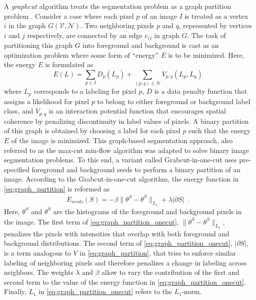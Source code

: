 A \textit{graphcut} algorithm treats the segmentation problem as a graph partition problem \cite{mincut_maxflow}. Consider a case where each pixel $p$ of an image $I$ is treated as a vertex $i$ in the graph $G(\mathcal{V},\mathcal{N})$. Two neighboring pixels $p$ and $q$, represented by vertices $i$ and $j$ respectively, are connected by an edge $e_{ij}$ in graph $G$. The task of partitioning this graph $G$ into foreground and background is cast as an optimization problem where some form of ``energy'' $E$ is to be minimized. Here, the energy $E$ is formulated as 
%
\begin{equation}	\label{eq:graph_partition}
  E(L)=\sum\limits_{p\in I} D_p(L_p)+\sum\limits_{(p,q)\in \mathcal{N}} V_{p,q} (L_p,L_q)
\end{equation}
%
where $L_p$ corresponds to a labeling for pixel $p$, $D$ is a data penalty function that assigns a likelihood for pixel $p$ to belong to either foreground or background label class, and $V_{p,q}$ is an interaction potential function that encourages spatial coherence by penalizing discontinuity in label values of pixels. A binary partition of this graph is obtained by choosing a label for each pixel $p$ such that the energy $E$ of the image is minimized. This graph-based segmentation approach, also referred to as the max-cut min-flow algorithm was adapted to solve binary image segmentation problems. To this end, a variant called Grabcut-in-one-cut \cite{onecut} uses pre-specified foreground and background seeds to perform a binary partition of an image. According to the Grabcut-in-one-cut algorithm, the energy function in \eqref{eq:graph_partition} is reformed as
%
\begin{equation} \label{eq:graph_partition_onecut}
  E_{seeds}(S)=-\beta \| \theta^S-\theta^{\bar{S}} \|_{L_1}+\lambda|\partial S|\enspace.
\end{equation}
%
Here, $\theta^S$ and $\theta^{\bar{S}}$ are the histograms of the foreground and background pixels in the image. The first term 
of \eqref{eq:graph_partition_onecut}, $\| \theta^S-\theta^{\bar{S}} \|_{L_1}$, penalizes the pixels with intensities that overlap with both foreground and background distributions. The second term of \eqref{eq:graph_partition_onecut}, $|\partial S|$, is a term analogous to $V$ in \eqref{eq:graph_partition}, that tries to enforce similar labeling of neighboring pixels and therefore penalizes a change in labeling across neighbors. The weights $\lambda$ and $\beta$ allow to vary the contribution of the first and second term to the value of the energy function in \eqref{eq:graph_partition_onecut}. Finally, $L_1$ in \eqref{eq:graph_partition_onecut} refers to the $L_1$-norm.

